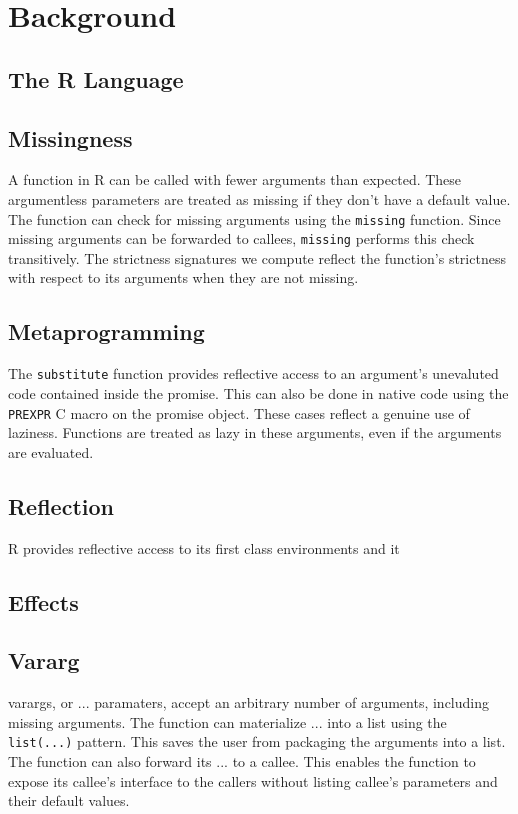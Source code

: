 \documentclass[screen,acmsmall]{acmart}
\newcommand{\code}[1]{\lstinline[style=R]|#1|\xspace}
\begin{document}
\section{Background}
\subsection{The R Language}

\subsection{Missingness}

A function in R can be called with fewer arguments than expected. These
argumentless parameters are treated as missing if they don't have a default
value. The function can check for missing arguments using the \code{missing}
function. Since missing arguments can be forwarded to callees, \code{missing}
performs this check transitively. The strictness signatures we compute reflect
the function's strictness with respect to its arguments when they are not
missing.


\subsection{Metaprogramming}
The \code{substitute} function provides reflective access to an argument's
unevaluted code contained inside the promise. This can also be done in native
code using the \code{PREXPR} C macro on the promise object. These cases reflect a
genuine use of laziness. Functions are treated as lazy in these arguments, even
if the arguments are evaluated.

\subsection{Reflection}
R provides reflective access to its first class environments and it 

\subsection{Effects}

\subsection{Vararg}
varargs, or $...$ paramaters, accept an arbitrary number of arguments, including
missing arguments. The function can materialize $...$ into a list using the
\code{list(...)} pattern. This saves the user from packaging the arguments into
a list. The function can also forward its $...$ to a callee. This enables the
function to expose its callee's interface to the callers without listing
callee's parameters and their default values. 
\end{document}
